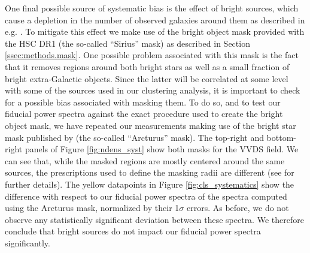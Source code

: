 \documentclass[a4paper,11pt]{article}
\begin{document}
      One final possible source of systematic bias is the effect of bright sources, which cause a depletion in the number of observed galaxies around them as described in e.g. \cite{2018PASJ...70S...7C}. To mitigate this effect we make use of the bright object mask provided with the HSC DR1 (the so-called ``Sirius'' mask) as described in Section \ref{ssec:methods.mask}. One possible problem associated with this mask is the fact that it removes regions around both bright stars as well as a small fraction of bright extra-Galactic objects. Since the latter will be correlated at some level with some of the sources used in our clustering analysis, it is important to check for a possible bias associated with masking them. To do so, and to test our fiducial power spectra against the exact procedure used to create the bright object mask, we have repeated our measurements making use of the bright star mask published by \cite{2018PASJ...70S...7C} (the so-called ``Arcturus'' mask). The top-right and bottom-right panels of Figure \ref{fig:ndens_syst} show both masks for the VVDS field. We can see that, while the masked regions are mostly centered around the same sources, the prescriptions used to define the masking radii are different (see \cite{2018PASJ...70S...7C} for further details). The yellow datapoints in Figure \ref{fig:cls_systematics} show the difference with respect to our fiducial power spectra of the spectra computed using the Arcturus mask, normalized by their 1$\sigma$ errors. As before, we do not observe any statistically significant deviation between these spectra. We therefore conclude that bright sources do not impact our fiducial power spectra significantly. 
      
\end{document}
